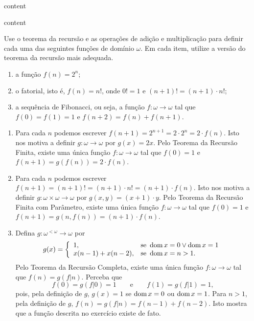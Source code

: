 \begin{exercicio}
	content
\end{exercicio}
\begin{solucao}
	content
\end{solucao}

\begin{exercicio}
	Use o teorema da recursão e as operações de adição e multiplicação para definir cada uma das seguintes funções de domínio $\omega$. Em cada item, utilize a versão do teorema da recursão mais adequada.
	\begin{enumerate}[label=(\alph{*})]
		\item a função $f(n)=2^n$;
		\item o fatorial, isto é, $f(n)=n!$, onde $0!=1$ e $(n+1)!=(n+1)\cdot n!$;
		\item a sequência de Fibonacci, ou seja, a função $f:\omega\to\omega$ tal que $f(0)=f(1)=1$ e $f(n+2)=f(n)+f(n+1)$.
	\end{enumerate}
\end{exercicio}
\begin{solucao}
	\begin{enumerate}[label=(\alph{*})]
		\item Para cada $n$ podemos escrever $f(n+1)=2^{n+1}=2\cdot 2^n=2\cdot f(n)$. Isto nos motiva a definir $g:\omega\to\omega$ por $g(x)=2x$. Pelo Teorema da Recursão Finita, existe uma única função $f:\omega\to\omega$ tal que $f(0)=1$ e $f(n+1)=g(f(n))=2\cdot f(n)$.
		\item Para cada $n$ podemos escrever $f(n+1)=(n+1)!=(n+1)\cdot n!=(n+1)\cdot f(n)$. Isto nos motiva a definir $g:\omega\times\omega\to\omega$ por $g(x,y)=(x+1)\cdot y$. Pelo Teorema da Recursão Finita com Parâmetro, existe uma única função $f:\omega\to\omega$ tal que $f(0)=1$ e $f(n+1)=g(n,f(n))=(n+1)\cdot f(n)$.
		\item Defina $g:\omega^{<\omega}\to \omega$ por
		$$
		g(x)=\left\{
			\begin{array}{ll}
				1,&\mathrm{se}\ \operatorname{dom} x=0 \vee \operatorname{dom} x=1 \\
				x(n-1)+x(n-2),& \mathrm{se}\ \operatorname{dom} x=n>1.
			\end{array}
		\right.
		$$
		Pelo Teorema da Recursão Completa, existe uma única função $f:\omega\to\omega$ tal que $f(n)=g(f|n)$. Perceba que
		$$f(0)=g(f|0)=1 \qquad \mathrm{e} \qquad f(1)=g(f|1)=1,$$
		pois, pela definição de $g$, $g(x)=1$ se $\operatorname{dom} x=0$ ou $\operatorname{dom} x=1$. Para $n>1$, pela definição de $g$,
		$f(n)=g(f|n)=f(n-1)+f(n-2)$. Isto mostra que a função descrita no exercício existe de fato.
	\end{enumerate}
\end{solucao}